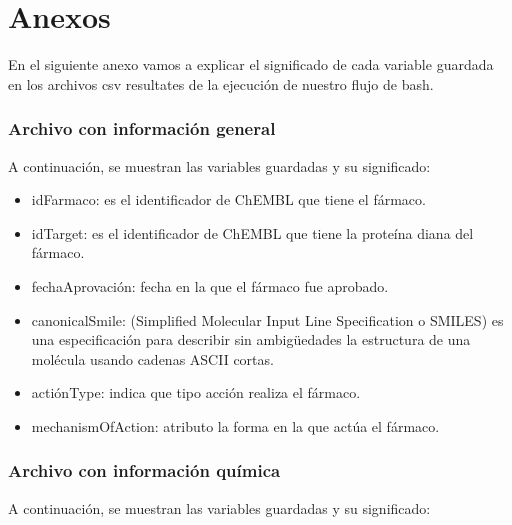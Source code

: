 \section{Anexos}

En el siguiente anexo vamos a explicar el significado de cada variable guardada en los archivos csv resultates de la ejecución de nuestro flujo de bash.

\subsubsection{Archivo con información general}

A continuación, se muestran las variables guardadas y su significado:

\begin{itemize}
\item idFarmaco: es el identificador de ChEMBL que tiene el fármaco.
\item idTarget: es el identificador de ChEMBL que tiene la proteína diana del fármaco. 
\item fechaAprovación: fecha en la que el fármaco fue aprobado.
\item canonicalSmile: (Simplified Molecular Input Line Specification o SMILES) es una especificación para describir sin ambigüedades la estructura de una molécula usando cadenas ASCII cortas. 
\item actiónType: indica que tipo acción realiza el fármaco.
\item mechanismOfAction: atributo la forma en la que actúa el fármaco.
\end{itemize}

\subsubsection{Archivo con información química}

A continuación, se muestran las variables guardadas y su significado:

